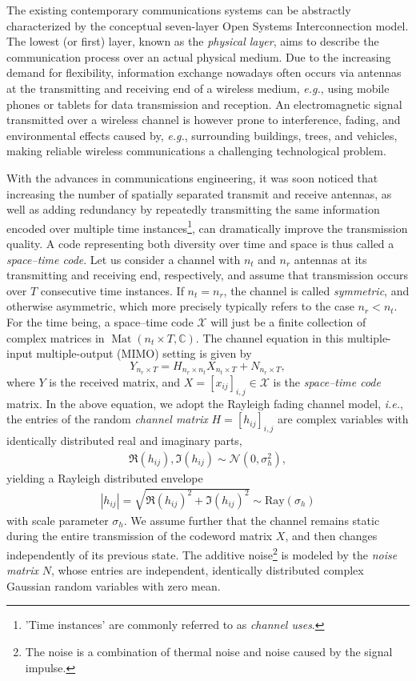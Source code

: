 \documentclass[smallextended]{svjour3}
\newcommand{\C}{\mathbb{C}}
\DeclareMathOperator{\Mat}{Mat}
\begin{document}
The existing contemporary communications systems can be abstractly characterized by the conceptual seven-layer Open Systems Interconnection model. The lowest (or first) layer, known as the \emph{physical layer}, aims to describe the communication process over an actual physical medium. Due to the increasing demand for flexibility, information exchange nowadays often occurs via antennas at the transmitting and receiving end of a wireless medium, \emph{e.g.}, using mobile phones or tablets for data transmission and reception.  
An electromagnetic signal transmitted over a wireless channel is however prone to interference, fading, and environmental effects caused by, \emph{e.g.}, surrounding buildings, trees, and vehicles, making reliable wireless communications a challenging technological problem. 

With the advances in communications engineering, it was soon noticed that increasing the number of spatially separated transmit and receive antennas, as well as adding redundancy by repeatedly transmitting the same information encoded over multiple time instances\footnote{'Time instances' are commonly referred to as \emph{channel uses}.}, can dramatically improve the transmission quality. A code representing both diversity over time and space is thus called a \emph{space--time code}. Let us consider a channel with $n_t$ and $n_r$ antennas at its transmitting and receiving end, respectively, and assume that transmission occurs over $T$ consecutive time instances. If $n_t = n_r$, the channel is called \emph{symmetric}, and otherwise asymmetric, which more precisely typically refers to the case $n_r < n_t$. For the time being, a space--time code $\mathcal{X}$ will just be a finite collection of complex matrices in $\Mat(n_t\times T,  \C)$. The channel equation in this multiple-input multiple-output (MIMO) setting is given by
\begin{equation}
\label{eqn:mimo}
	Y_{n_r\times T} = H_{n_r\times n_t}X_{n_t\times T} + N_{n_r\times T}, 
\end{equation}
where $Y$ is the received matrix, and $X = \left[x_{ij}\right]_{i,j}\in\mathcal{X}$ is the \emph{space--time code} matrix. In the above equation, we adopt the Rayleigh fading channel model, \emph{i.e.}, the entries of the random \emph{channel matrix} $H = \left[h_{ij}\right]_{i,j}$ are complex variables with identically distributed real and imaginary parts,
\begin{align*}
	\Re(h_{ij}), \Im(h_{ij}) \sim \mathcal{N}(0,\sigma_h^2),
\end{align*}
yielding a Rayleigh distributed envelope 
\begin{align*}
	|h_{ij}| = \sqrt{\Re(h_{ij})^2+\Im(h_{ij})^2} \sim \text{Ray}(\sigma_h)
\end{align*} 
with scale parameter $\sigma_h$. We assume further that the channel remains static during the entire transmission of the codeword matrix $X$, and then changes independently of its previous state. The additive noise\footnote{The noise is a combination of thermal noise and noise caused by the signal impulse.} is modeled by the \emph{noise matrix} $N$, whose entries are independent, identically distributed complex Gaussian random variables with zero mean. 
\end{document}
